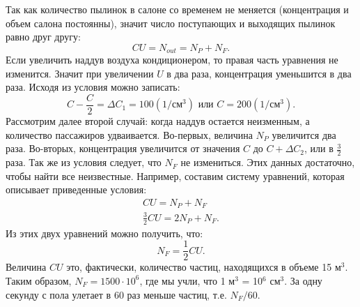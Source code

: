 Так как количество пылинок в салоне со временем не меняется (концентрация и объем салона постоянны), значит число поступающих и выходящих пылинок равно друг другу:
\begin{equation}
C U = N_{out} = N_P + N_F. \label{eq:spb19_07_04_1}
\end{equation} 
Если увеличить наддув воздуха кондиционером, то правая часть уравнения не изменится. Значит при увеличении $U$ в два раза, концентрация уменьшится в два раза. Исходя из условия можно записать:
\begin{equation}
C - \frac{C}{2} = \Delta C_1 = 100 \left( 1/\text{см}^{3} \right)  \text{ или }  C = 200 \left( 1/\text{см}^{3} \right). 
\end{equation}
Рассмотрим далее второй случай: когда наддув остается неизменным, а количество пассажиров удваивается. Во-первых, величина $N_P$ увеличится два раза. Во-вторых, концентрация увеличится от значения $C$ до $C+\Delta C_2$, или в $\frac{3}{2}$ раза. Так же из условия следует, что $N_F$ не измениться. Этих данных достаточно, чтобы найти все неизвестные. Например, составим систему уравнений, которая описывает приведенные условия:
\begin{eqnarray}
C U = N_P + N_F \\
\frac{3}{2} C U = 2 N_P + N_F \label{eq:spb19_07_04_2}.
\end{eqnarray}
Из этих двух уравнений можно получить, что:
\begin{equation}
N_F = \frac{1}{2} C U.
\end{equation}
Величина $C U$ это, фактически, количество частиц, находящихся в объеме 15 м$^3$. Таким образом, $N_F = 1500 \cdot 10^6$, где мы учли, что 1 м$^3$ = 10$^6$ см$^3$. За одну секунду с пола улетает в 60 раз меньше частиц, т.е. $N_F/60$.



\ifgrade
\begin{grade-env}
\end{grade-env}
\fi